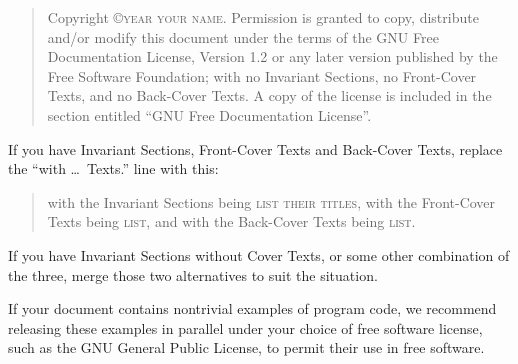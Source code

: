 \bigskip
\begin{quote}
    Copyright \copyright \textsc{year your name}.
    Permission is granted to copy, distribute and/or modify this document
    under the terms of the GNU Free Documentation License, Version 1.2
    or any later version published by the Free Software Foundation;
    with no Invariant Sections, no Front-Cover Texts, and no Back-Cover Texts.
    A copy of the license is included in the section entitled ``GNU
    Free Documentation License''.
\end{quote}
\bigskip

If you have Invariant Sections, Front-Cover Texts and Back-Cover Texts, replace
the ``with \dots\ Texts.'' line with this:

\bigskip
\begin{quote}
    with the Invariant Sections being \textsc{list their titles}, with the
    Front-Cover Texts being \textsc{list}, and with the Back-Cover
    Texts being \textsc{list}.
\end{quote}
\bigskip

If you have Invariant Sections without Cover Texts, or some other combination
of the three, merge those two alternatives to suit the situation.

If your document contains nontrivial examples of program code, we recommend
releasing these examples in parallel under your choice of free software
license, such as the GNU General Public License, to permit their use in free
software.


